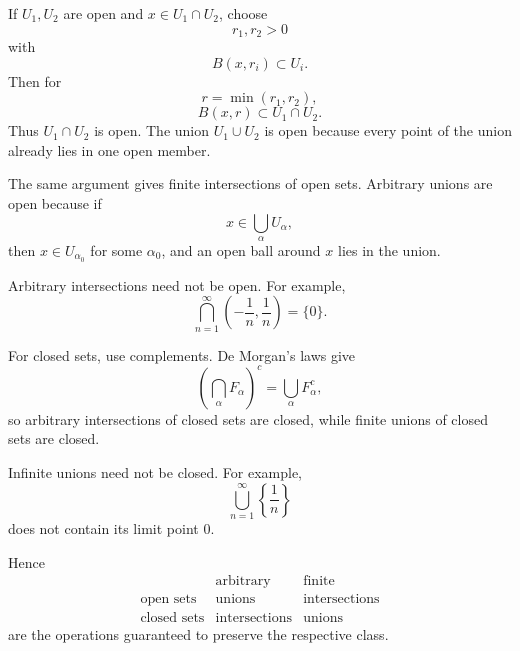 \begin{solution}
If \(U_1,U_2\) are open and \(x\in U_1\cap U_2\), choose
\[
r_1,r_2>0
\]
with
\[
B(x,r_i)\subset U_i.
\]
Then for
\[
r=\min(r_1,r_2),
\]
\[
B(x,r)\subset U_1\cap U_2.
\]
Thus \(U_1\cap U_2\) is open. The union \(U_1\cup U_2\) is open because every point of the union already lies in one open member.

The same argument gives finite intersections of open sets. Arbitrary unions are open because if
\[
x\in\bigcup_{\alpha}U_\alpha,
\]
then \(x\in U_{\alpha_0}\) for some \(\alpha_0\), and an open ball around \(x\) lies in the union.

Arbitrary intersections need not be open. For example,
\[
\bigcap_{n=1}^{\infty}
\left(-\frac1n,\frac1n\right)
=
\{0\}.
\]

For closed sets, use complements. De Morgan's laws give
\[
\left(\bigcap_\alpha F_\alpha\right)^c
=
\bigcup_\alpha F_\alpha^c,
\]
so arbitrary intersections of closed sets are closed, while finite unions of closed sets are closed.

Infinite unions need not be closed. For example,
\[
\bigcup_{n=1}^{\infty}
\left\{\frac1n\right\}
\]
does not contain its limit point \(0\).

Hence
\[
\boxed{
\begin{array}{c|cc}
 & \text{arbitrary} & \text{finite}\\ \hline
\text{open sets} & \text{unions} & \text{intersections}\\
\text{closed sets} & \text{intersections} & \text{unions}
\end{array}
}
\]
are the operations guaranteed to preserve the respective class.
\end{solution}


